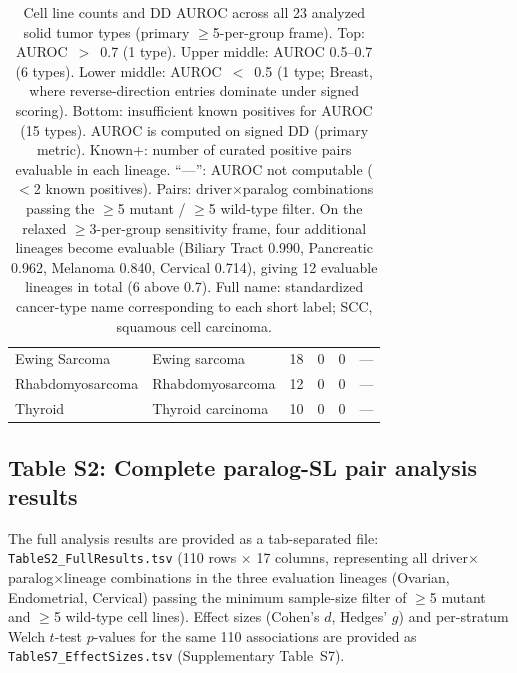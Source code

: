 \documentclass[11pt,a4paper]{article}
\begin{document}
\begin{table}[H]
\begin{tabular}{llrrrr}
Ewing Sarcoma & Ewing sarcoma & 18 & 0 & 0 & --- \\
Rhabdomyosarcoma & Rhabdomyosarcoma & 12 & 0 & 0 & --- \\
Thyroid & Thyroid carcinoma & 10 & 0 & 0 & --- \\
\bottomrule
\end{tabular}
\caption{Cell line counts and DD AUROC across all 23 analyzed solid tumor types (primary $\geq$5-per-group frame). Top: AUROC~$>$~0.7 (1 type). Upper middle: AUROC 0.5--0.7 (6 types). Lower middle: AUROC~$<$~0.5 (1 type; Breast, where reverse-direction entries dominate under signed scoring). Bottom: insufficient known positives for AUROC (15 types). AUROC is computed on signed DD (primary metric). Known+: number of curated positive pairs evaluable in each lineage. ``---'': AUROC not computable ($<$2 known positives). Pairs: driver$\times$paralog combinations passing the $\geq$5 mutant / $\geq$5 wild-type filter. On the relaxed $\geq$3-per-group sensitivity frame, four additional lineages become evaluable (Biliary Tract 0.990, Pancreatic 0.962, Melanoma 0.840, Cervical 0.714), giving 12 evaluable lineages in total (6 above 0.7). Full name: standardized cancer-type name corresponding to each short label; SCC, squamous cell carcinoma.}
\end{table}

\subsection{Table S2: Complete paralog-SL pair analysis results}
The full analysis results are provided as a tab-separated file: \texttt{TableS2\_FullResults.tsv} (110 rows $\times$ 17 columns, representing all driver$\times$paralog$\times$lineage combinations in the three evaluation lineages (Ovarian, Endometrial, Cervical) passing the minimum sample-size filter of $\geq$5 mutant and $\geq$5 wild-type cell lines). Effect sizes (Cohen's $d$, Hedges' $g$) and per-stratum Welch $t$-test $p$-values for the same 110 associations are provided as \texttt{TableS7\_EffectSizes.tsv} (Supplementary Table~S7).
\end{document}
